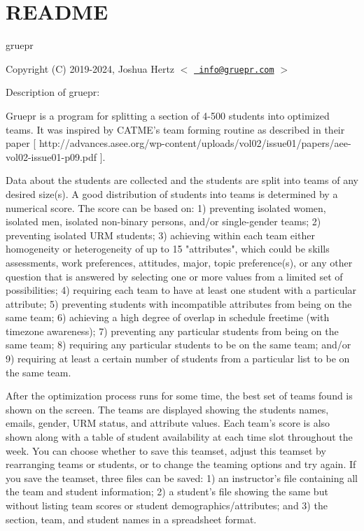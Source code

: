 \chapter{README}
\hypertarget{md__2_users_2johnnyassad_2_desktop_2gruepr_2_r_e_a_d_m_e}{}\label{md__2_users_2johnnyassad_2_desktop_2gruepr_2_r_e_a_d_m_e}
gruepr

Copyright (C) 2019-\/2024, Joshua Hertz \texorpdfstring{$<$}{<} \href{mailto:info@gruepr.com}{\texttt{ info@gruepr.\+com}} \texorpdfstring{$>$}{>}

 Description of gruepr\+: \begin{DoxyVerb} Gruepr is a program for splitting a section of 4-500 students into optimized teams.
 It was inspired by CATME's team forming routine as described in their paper
 [ http://advances.asee.org/wp-content/uploads/vol02/issue01/papers/aee-vol02-issue01-p09.pdf ].

 Data about the students are collected and the students are split into teams of any desired size(s). A
 good distribution of students into teams is determined by a numerical score. The score can be based on:
    1) preventing isolated women, isolated men, isolated non-binary persons, and/or single-gender teams;
    2) preventing isolated URM students;
    3) achieving within each team either homogeneity or heterogeneity of up to 15 "attributes", which 
       could be skills assessments, work preferences, attitudes, major, topic preference(s), or any 
       other question that is answered by selecting one or more values from a limited set of 
       possibilities;
    4) requiring each team to have at least one student with a particular attribute;
    5) preventing students with incompatible attributes from being on the same team;
    6) achieving a high degree of overlap in schedule freetime (with timezone awareness);
    7) preventing any particular students from being on the same team;
    8) requiring any particular students to be on the same team; and/or
    9) requiring at least a certain number of students from a particular list to be on the same team.

 After the optimization process runs for some time, the best set of teams found is shown on the screen.
 The teams are displayed showing the students names, emails, gender, URM status, and attribute values.
 Each team's score is also shown along with a table of student availability at each time slot throughout
 the week. You can choose whether to save this teamset, adjust this teamset by rearranging teams or
 students, or to change the teaming options and try again. If you save the teamset, three files can be
 saved: 1) an instructor's file containing all the team and student information; 2) a student's file
 showing the same but without listing team scores or student demographics/attributes; and 3) the
 section, team, and student names in a spreadsheet format.


\end{DoxyVerb}
